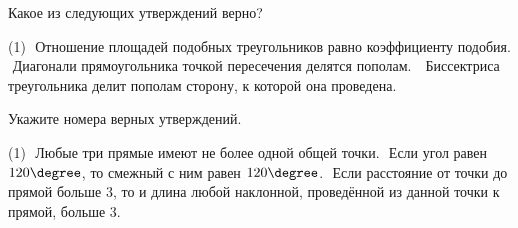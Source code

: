 \begin{class}[number=8]
\begin{listofex}
     	\item Какое из следующих утверждений верно?
     	\begin{tasks}(1)
     	\task  Отношение площадей подобных треугольников равно коэффициенту подобия.
     	\task  Диагонали прямоугольника точкой пересечения делятся пополам.
        \task Биссектриса треугольника делит пополам сторону, к которой она проведена.
     \end{tasks}
 	\item Укажите номера верных утверждений.
 	\begin{tasks}(1)
 		\task  Любые три прямые имеют не более одной общей точки.
 		\task  Если угол равен \( 120\degree \), то смежный с ним равен \( 120\degree \).
 		\task  Если расстояние от точки до прямой больше \( 3 \), то и длина любой наклонной, проведённой из данной точки к прямой, больше \( 3 \).
 	\end{tasks}
 	
 	
 	
	\end{listofex}
\end{class}
